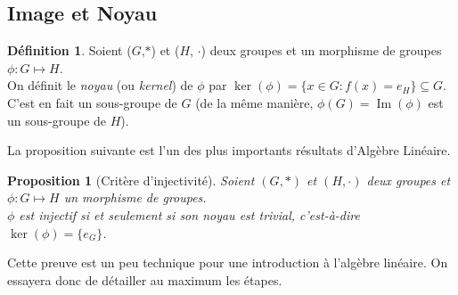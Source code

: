 \documentclass[oneside,12pt,french,table]{book}
\DeclareMathOperator{\im}{Im}
\newtheorem{prop}{Proposition}[section]
\theoremstyle{definition}
\theoremstyle{definition}
\theoremstyle{definition}
\newtheorem{definition}{Définition}[chapter]
\begin{document}
\subsection{Image et Noyau}
\begin{definition}
 Soient ($G$,$*$) et ($H$, $\cdot$) deux groupes et un morphisme de groupes $\phi : G \mapsto H$. \\
 On définit le \textit{noyau} (ou \textit{kernel}) de $\phi$ par $\ker(\phi) = \{x \in G : f(x) = e_H \} \subseteq G$. \\
 C'est en fait un sous-groupe de $G$ (de la même manière, $\phi(G)= \im(\phi)$ est un sous-groupe de $H$).
\end{definition}
\noindent
La proposition suivante est l'un des plus importants résultats d'Algèbre Linéaire. 
\begin{prop}[Critère d'injectivité]
Soient $(G,*)$ et $(H, \cdot)$ deux groupes et $\phi : G \mapsto H$ un morphisme de groupes. \\
$\phi$ est injectif si et seulement si son noyau est trivial, c'est-à-dire $\ker(\phi) = \{e_G\}$.
\end{prop}
\noindent
Cette preuve est un peu technique pour une introduction à l'algèbre linéaire. On essayera donc de détailler au maximum les étapes.
\end{document}

